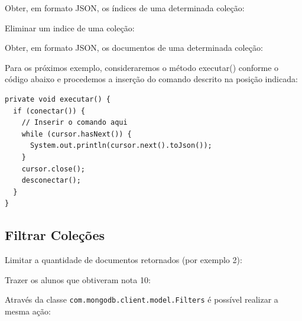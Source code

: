Obter, em formato JSON, os índices de uma determinada coleção: \\

Eliminar um indice de uma coleção: \\

Obter, em formato JSON, os documentos de uma determinada coleção: \\

Para os próximos exemplo, consideraremos o método executar() conforme o código abaixo e procedemos a inserção do comando descrito na posição indicada:
\begin{lstlisting}[]
private void executar() {
  if (conectar()) {
    // Inserir o comando aqui
    while (cursor.hasNext()) {
      System.out.println(cursor.next().toJson());
    }
    cursor.close();  
    desconectar();
  }
}
\end{lstlisting}

\subsection{Filtrar Coleções}
Limitar a quantidade de documentos retornados (por exemplo 2): \\

Trazer os alunos que obtiveram nota 10: \\

Através da classe \texttt{com.mongodb.client.model.Filters} é possível realizar a mesma ação: \\

